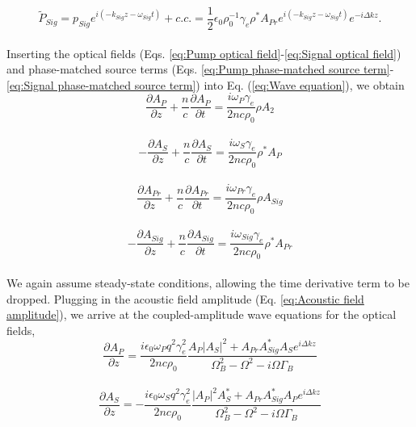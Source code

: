 \documentclass[
sn-nature,
twocolumn
]{sn-jnl}%
\begin{document}
\begin{appendices}
\begin{equation}
    \tilde{P}_{Sig} = p_{Sig}e^{i(-k_{Sig}z - \omega_{Sig} t)} + c.c. = \frac{1}{2}\epsilon_{0}\rho_{0}^{-1}\gamma_{e}\rho^{*} A_{Pr}e^{i(-k_{Sig}z - \omega_{Sig} t)}e^{-i\Delta kz}.
    \label{eq:Signal phase-matched source term}
\end{equation}
\\
Inserting the optical fields (Eqs. \ref{eq:Pump optical field}-\ref{eq:Signal optical field}) and phase-matched source terms (Eqs. \ref{eq:Pump phase-matched source term}-\ref{eq:Signal phase-matched source term}) into Eq. (\ref{eq:Wave equation}), we obtain
\\
\begin{equation}
    \frac{\partial A_{P}}{\partial z} + \frac{n}{c}\frac{\partial A_{P}}{\partial t} = \frac{i\omega_{P}\gamma_{e}}{2nc\rho_{0}}\rho A_{2}
\end{equation}
\\
\begin{equation}
    -\frac{\partial A_{S}}{\partial z} + \frac{n}{c}\frac{\partial A_{S}}{\partial t} = \frac{i\omega_{S}\gamma_{e}}{2nc\rho_{0}}\rho^{*}A_{P}
\end{equation}
\\
\begin{equation}
    \frac{\partial A_{Pr}}{\partial z} + \frac{n}{c}\frac{\partial A_{Pr}}{\partial t} = \frac{i\omega_{Pr}\gamma_{e}}{2nc\rho_{0}}\rho A_{Sig}
\end{equation}
\\
\begin{equation}
    -\frac{\partial A_{Sig}}{\partial z} + \frac{n}{c}\frac{\partial A_{Sig}}{\partial t} = \frac{i\omega_{Sig}\gamma_{e}}{2nc\rho_{0}}\rho^{*}A_{Pr}
\end{equation}
\\
We again assume steady-state conditions, allowing the time derivative term to be dropped. Plugging in the acoustic field amplitude (Eq. \ref{eq:Acoustic field amplitude}), we arrive at the coupled-amplitude wave equations for the optical fields,
\\
\begin{equation}
    \frac{\partial A_{P}}{\partial z} = \frac{i\epsilon_{0}\omega_{P} q^{2}\gamma_{e}^{2}}{2nc\rho_{0}}\frac{A_{P}|A_{S}|^{2} + A_{Pr}A_{Sig}^{*}A_{S}e^{i\Delta kz}}{\Omega_{B}^{2} - \Omega^{2} - i\Omega\Gamma_{B}}
\end{equation}
\\
\begin{equation}
    \frac{\partial A_{S}}{\partial z} = -\frac{i\epsilon_{0}\omega_{S} q^{2}\gamma_{e}^{2}}{2nc\rho_{0}}\frac{|A_{P}|^{2}A_{S}^{*} + A_{Pr}A_{Sig}^{*}A_{P}e^{i\Delta kz}}{\Omega_{B}^{2} - \Omega^{2} - i\Omega\Gamma_{B}}

\end{equation}
\end{appendices}
\end{document}
